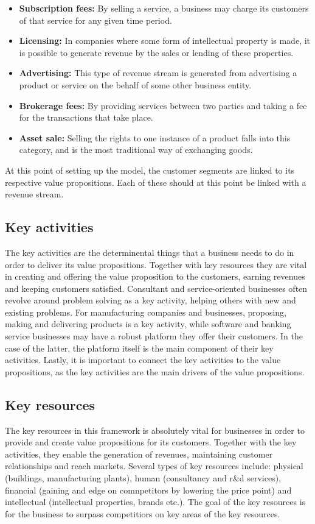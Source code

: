 \begin{itemize}
    \item \textbf{Subscription fees: }By selling a service, a business may charge its customers of that service for any given time period. 
    \item \textbf{Licensing: }In companies where some form of intellectual property is made, it is possible to generate revenue by the sales or lending of these properties.
    \item \textbf{Advertising: }This type of revenue stream is generated from advertising a product or service on the behalf of some other business entity.
    \item \textbf{Brokerage fees: }By providing services between two parties and taking a fee for the transactions that take place.
    \item \textbf{Asset sale: }Selling the rights to one instance of a product falls into this category, and is the most traditional way of exchanging goods.
\end{itemize}

At this point of setting up the model, the customer segments are linked to its respective value propositions. Each of these should at this point be linked with a revenue stream.

\subsection{Key activities}
The key activities are the determinental things that a business needs to do in order to deliver its value propositions. Together with key resources they are vital in creating and offering the value proposition to the customers, earning revenues and keeping customers satisfied. Consultant and service-oriented businesses often revolve around problem solving as a key activity, helping others with new and existing problems. For manufacturing companies and businesses, proposing, making and delivering products is a key activity, while software and banking service businesses may have a robust platform they offer their customers. In the case of the latter, the platform itself is the main component of their key activities. Lastly, it is important to connect the key activities to the value propositions, as the key activities are the main drivers of the value propositions.

\subsection{Key resources}
The key resources in this framework is absolutely vital for businesses in order to provide and create value propositions for its customers. Together with the key activities, they enable the generation of revenues, maintaining customer relationships and reach markets. Several types of key resources include:  physical (buildings, manufacturing plants), human (consultancy and r\&d services), financial (gaining and edge on comnpetitors by lowering the price point) and intellectual (intellectual properties, brands etc.). The goal 
of the key resources is for the business to surpass competitiors on key areas of the key resources.

